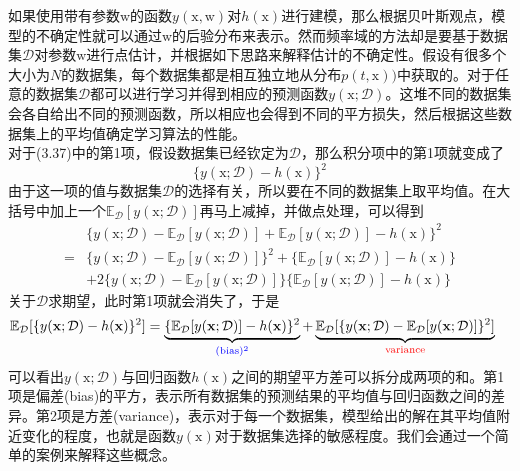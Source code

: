 \documentclass[b5paper]{book}
\numberwithin{equation}{chapter}
\newcommand {\bx} {\boldsymbol{\mathrm{x}}}
\newcommand {\bw} {\boldsymbol{\mathrm{w}}}
\begin{document}
{	\indent 如果使用带有参数$\bw$的函数$y(\bx,\bw)$对$h(\bx)$进行建模，那么根据贝叶斯观点，模型的不确定性就可以通过$\bw$的后验分布来表示。然而频率域的方法却是要基于数据集$\mathcal{D}$对参数$\bw$进行点估计，并根据如下思路来解释估计的不确定性。假设有很多个大小为$N$的数据集，每个数据集都是相互独立地从分布$p(t,\bx))$中获取的。对于任意的数据集$\mathcal{D}$都可以进行学习并得到相应的预测函数$y(\bx;\mathcal{D})$。这堆不同的数据集会各自给出不同的预测函数，所以相应也会得到不同的平方损失，然后根据这些数据集上的平均值确定学习算法的性能。\\
	\indent 对于(3.37)中的第1项，假设数据集已经钦定为$\mathcal{D}$，那么积分项中的第1项就变成了
	\begin{equation}
		\{y(\bx;\mathcal{D})-h(\bx)\}^2
	\end{equation}
	由于这一项的值与数据集$\mathcal{D}$的选择有关，所以要在不同的数据集上取平均值。在大括号中加上一个$\mathbb{E}_{\mathcal{D}}[y(\bx;\mathcal{D})]$再马上减掉，并做点处理，可以得到
	\begin{equation}
	\begin{split}
		&\{y(\bx;\mathcal{D})-\mathbb{E}_\mathcal{D}[y(\bx;\mathcal{D})] + \mathbb{E}_\mathcal{D}[y(\bx;\mathcal{D})] -h(\bx)\}^2 \\
		= &\{y(\bx;\mathcal{D})-\mathbb{E}_\mathcal{D}[y(\bx;\mathcal{D})]\}^2 + \{\mathbb{E}_\mathcal{D}[y(\bx;\mathcal{D})] - h(\bx)\} \\
		&+ 2\{y(\bx;\mathcal{D})-\mathbb{E}_\mathcal{D}[y(\bx;\mathcal{D})]\}\{\mathbb{E}_\mathcal{D}[y(\bx;\mathcal{D})]-h(\bx)\}
	\end{split}
	\end{equation}
	关于$\mathcal{D}$求期望，此时第1项就会消失了，于是
	\begin{equation}
	\begin{split}
		&\mathbb{E}_{\mathcal{D}}[\{y(\bx;\mathcal{D})-h(\bx)\}^2] 	= \underbrace{\{\mathbb{E}_\mathcal{D}[y(\bx;\mathcal{D})]-h(\bx)\}^2}_{\textcolor{blue}{(\mathrm{bias})^2}} + \underbrace{\mathbb{E}_{\mathcal{D}}[\{y(\bx;\mathcal{D})-\mathbb{E}_\mathcal{D}[y(\bx;\mathcal{D})]\}^2]}_{\textcolor{red}{\mathrm{variance}}}
		\end{split}
	\end{equation}
	可以看出$y(\bx;\mathcal{D})$与回归函数$h(\bx)$之间的期望平方差可以拆分成两项的和。第1项是偏差(bias)的平方，表示所有数据集的预测结果的平均值与回归函数之间的差异。第2项是方差(variance)，表示对于每一个数据集，模型给出的解在其平均值附近变化的程度，也就是函数$y(\bx)$对于数据集选择的敏感程度。我们会通过一个简单的案例来解释这些概念。\\
}
\end{document}
